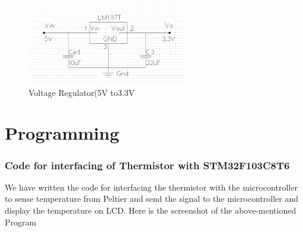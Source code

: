 \documentclass[12pt]{article}
\begin{document}
\begin{figure}[h]
    \centering
    \includegraphics[width=7cm]{Voltage regulator.jpeg}
    \caption{Voltage Regulator(5V to3.3V}
    \label{fig:galaxy}
\end{figure}


\section{Programming}

\subsubsection{Code for interfacing of \textbf{Thermistor} with \textbf{STM32F103C8T6}}
We have written the code for interfacing the thermistor with the microcontroller to sense temperature from Peltier and send the signal to the microcontroller and display the temperature on LCD.
Here is the screenshot of the above-mentioned Program
\end{document}
